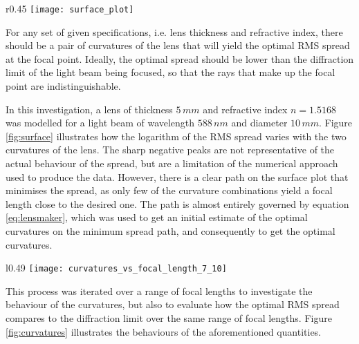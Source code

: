 \documentclass{article}
\begin{document}
\begin{wrapfigure}{r}{0.45\textwidth}
\centering
\texttt{[image: surface\_plot]}
\caption{Surface plot of $\log_{10}$RMS spread with respect to lens curvatures.}
\label{fig:surface}
\end{wrapfigure}

For any set of given specifications, i.e. lens thickness and refractive index, there should be a pair of curvatures of the lens that will yield the optimal RMS spread at the focal point. Ideally, the optimal spread should be lower than the diffraction limit of the light beam being focused, so that the rays that make up the focal point are indistinguishable.

In this investigation, a lens of thickness $5\,mm$ and refractive index $n=1.5168$ was modelled for a light beam of wavelength $588\, nm$ and diameter $10\,mm$. Figure \ref{fig:surface} illustrates how the logarithm of the RMS spread varies with the two curvatures of the lens. The sharp negative peaks are not representative of the actual behaviour of the spread, but are a limitation of the numerical approach used to produce the data. However, there is a clear path on the surface plot that minimises the spread, as only few of the curvature combinations yield a focal length close to the desired one. The path is almost entirely governed by equation \ref{eq:lensmaker}, which was used to get an initial estimate of the optimal curvatures on the minimum spread path, and consequently to get the optimal curvatures.

\begin{wrapfigure}{l}{0.49\textwidth}
\centering
\texttt{[image: curvatures\_vs\_focal\_length\_7\_10]}
\caption{Plot of optimal curvatures and their respective RMS spread and diffraction limit against focal length.}
\label{fig:curvatures}
\end{wrapfigure}

This process was iterated over a range of focal lengths to investigate the behaviour of the curvatures, but also to evaluate how the optimal RMS spread compares to the diffraction limit over the same range of focal lengths. Figure \ref{fig:curvatures} illustrates the behaviours of the aforementioned quantities.
\end{document}

